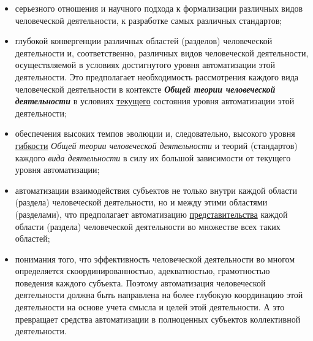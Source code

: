 \begin{scnsubstruct}
{\begin{itemize}
            \item серьезного отношения и научного подхода к формализации различных видов человеческой деятельности, к разработке самых различных стандартов;
            \item глубокой конвергенции различных областей (разделов) человеческой деятельности и, соответственно, различных видов человеческой деятельности, осуществляемой в условиях достигнутого уровня автоматизации этой деятельности. Это предполагает необходимость рассмотрения каждого вида человеческой деятельности в контексте \textbf{\textit{Общей теории человеческой деятельности}} в условиях \underline{текущего} состояния уровня автоматизации этой деятельности;
            \item обеспечения высоких темпов эволюции и, следовательно, высокого уровня \underline{гибкости} \textit{Общей теории человеческой деятельности} и теорий (стандартов) каждого \textit{вида деятельности} в силу их большой зависимости от текущего уровня автоматизации;
            \item автоматизации взаимодействия субъектов не только внутри каждой области (раздела) человеческой деятельности, но и между этими областями (разделами), что предполагает автоматизацию \underline{представительства} каждой области (раздела) человеческой деятельности во множестве всех таких областей;
            \item понимания того, что эффективность человеческой деятельности во многом определяется скоординированностью, адекватностью, грамотностью поведения каждого субъекта. Поэтому автоматизация человеческой деятельности должна быть направлена на более глубокую координацию этой деятельности на основе учета смысла и целей этой деятельности. А это превращает средства автоматизации в полноценных субъектов коллективной деятельности.
        \end{itemize}}
    
    

\end{scnsubstruct}
